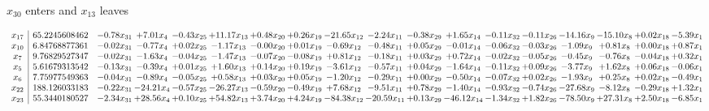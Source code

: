 \documentclass[9pt]{article}
\begin{document}
 $ x_{30} $ enters and $ x_{13} $ leaves 

 \[\begin{array}{c| c c@{\hskip 2pt} c@{\hskip 2pt} c@{\hskip 2pt} c@{\hskip 2pt} c@{\hskip 2pt} c@{\hskip 2pt} c@{\hskip 2pt} c@{\hskip 2pt} c@{\hskip 2pt} c@{\hskip 2pt} c@{\hskip 2pt} c@{\hskip 2pt} c@{\hskip 2pt} c@{\hskip 2pt} c@{\hskip 2pt} c@{\hskip 2pt} }
 x_{17}   &  65.2245608462 & -0.78 x_{31} & +  7.01 x_{4} & -0.43 x_{25} & + 11.17 x_{13} & +  0.48 x_{20} & +  0.26 x_{19} & -21.65 x_{12} & -2.24 x_{11} & -0.38 x_{29} & +  1.65 x_{14} & -0.11 x_{32} & -0.11 x_{26} & -14.16 x_{9} & -15.10 x_{8} & +  0.02 x_{18} & -5.39 x_{1}\\
 x_{10}   &  6.84768877361 & -0.02 x_{31} & -0.77 x_{4} & +  0.02 x_{25} & -1.17 x_{13} & -0.00 x_{20} & +  0.01 x_{19} & -0.69 x_{12} & -0.48 x_{11} & +  0.05 x_{29} & -0.01 x_{14} & -0.06 x_{32} & -0.03 x_{26} & -1.09 x_{9} & +  0.81 x_{8} & +  0.00 x_{18} & +  0.87 x_{1}\\
 x_{7}   &  9.76829527347 & -0.02 x_{31} & -1.63 x_{4} & -0.04 x_{25} & -1.47 x_{13} & -0.07 x_{20} & -0.08 x_{19} & +  0.81 x_{12} & -0.18 x_{11} & +  0.03 x_{29} & +  0.72 x_{14} & -0.02 x_{32} & -0.05 x_{26} & -0.45 x_{9} & -0.76 x_{8} & -0.04 x_{18} & +  0.32 x_{1}\\
 x_{5}   &  5.61679313542 & -0.13 x_{31} & -0.39 x_{4} & +  0.01 x_{25} & +  1.60 x_{13} & +  0.14 x_{20} & +  0.19 x_{19} & -3.61 x_{12} & -0.57 x_{11} & +  0.04 x_{29} & -1.64 x_{14} & -0.11 x_{32} & +  0.09 x_{26} & -3.77 x_{9} & +  1.62 x_{8} & +  0.06 x_{18} & -0.06 x_{1}\\
 x_{6}   &  7.75977549363 & -0.04 x_{31} & -0.89 x_{4} & -0.05 x_{25} & +  0.58 x_{13} & +  0.03 x_{20} & +  0.05 x_{19} & -1.20 x_{12} & -0.29 x_{11} & +  0.00 x_{29} & -0.50 x_{14} & -0.07 x_{32} & +  0.02 x_{26} & -1.93 x_{9} & +  0.25 x_{8} & +  0.02 x_{18} & -0.49 x_{1}\\
 x_{22}   &  188.126033183 & -0.22 x_{31} & -24.21 x_{4} & -0.57 x_{25} & -26.27 x_{13} & -0.59 x_{20} & -0.49 x_{19} & +  7.68 x_{12} & -9.51 x_{11} & +  0.78 x_{29} & -1.40 x_{14} & -0.93 x_{32} & -0.74 x_{26} & -27.68 x_{9} & -8.12 x_{8} & -0.29 x_{18} & +  1.32 x_{1}\\
 x_{23}   &  55.3440180527 & -2.34 x_{31} & + 28.56 x_{4} & +  0.10 x_{25} & + 54.82 x_{13} & +  3.74 x_{20} & +  4.24 x_{19} & -84.38 x_{12} & -20.59 x_{11} & +  0.13 x_{29} & -46.12 x_{14} & -1.34 x_{32} & +  1.82 x_{26} & -78.50 x_{9} & + 27.31 x_{8} & +  2.50 x_{18} & -6.85 x_{1}\\

\end{array}\]
\end{document}

